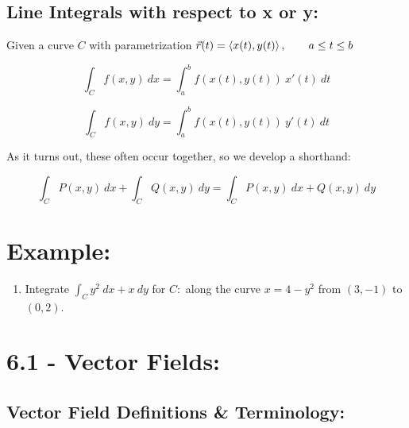 \vfill


\subsection*{Line Integrals with respect to  x or y:}

Given a curve \(C\) with parametrization \(\vec{r}(t) = \left\langle x(t), y(t)\right\rangle, \qquad a\leq t \leq b\)

\[
\int_C f(x,y)\ dx = \int_a^b f( x(t), y(t) )\ x'(t)\ dt 
\]

\[
\int_C f(x,y)\ dy = \int_a^b f( x(t), y(t) )\ y'(t)\ dt 
\]

As it turns out, these often occur together, so we develop a shorthand:

\[
\int_C P(x,y)\ dx + \int_C Q(x,y)\ dy = \int_C P(x,y)\ dx +  Q(x,y)\ dy
\]



\section*{Example:}


\begin{enumerate}[{Example} 1: ]
\addtocounter{enumi}{1}
\item Integrate \(\int_C y^2\ dx + x\ dy\) for \(C:\) along the curve \(x=4-y^2\) from \((3,-1)\) to \((0,2)\).

\vfill




\end{enumerate}

\pagebreak

\section*{6.1 - Vector Fields:}


\subsection*{Vector Field Definitions \& Terminology:}

